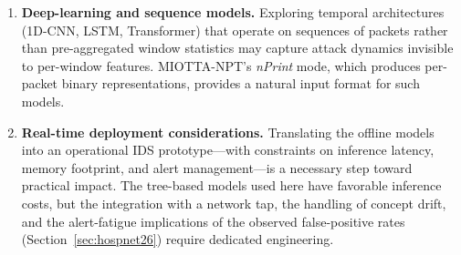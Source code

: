 \begin{enumerate}[nosep]
  \item \textbf{Deep-learning and sequence models.}
  Exploring temporal architectures (1D-CNN, LSTM, Transformer) that operate on sequences of packets rather than pre-aggregated window statistics may capture attack dynamics invisible to per-window features. MIOTTA-NPT's \emph{nPrint} mode, which produces per-packet binary representations, provides a natural input format for such models.

  \item \textbf{Real-time deployment considerations.}
  Translating the offline models into an operational IDS prototype---with constraints on inference latency, memory footprint, and alert management---is a necessary step toward practical impact. The tree-based models used here have favorable inference costs, but the integration with a network tap, the handling of concept drift, and the alert-fatigue implications of the observed false-positive rates (Section~\ref{sec:hospnet26}) require dedicated engineering.
\end{enumerate}
